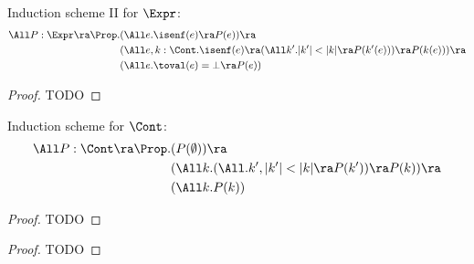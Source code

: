 \begin{lemma}
Induction scheme II for $\Expr$:
\begin{align*}
\All P: \Expr \ra \Prop.
  &(\All e. \isenf(e) \ra P(e)) \ra \\
  &(\All e, k: \Cont . \isenf(e) \ra (\All k'. |k'| < |k| \ra P (k'(e))) \ra P(k(e))) \ra\\
  &(\All e. \toval(e) = \bot \ra P(e))
\end{align*}
\end{lemma}
\begin{proof}
  TODO
\end{proof}

\begin{lemma}
  Induction scheme for $\Cont$:
  \begin{align*}
    \All P: \Cont \ra \Prop.
      &(P(\emptyset)) \ra \\
      &(\All k. (\All. k', |k'| < |k| \ra P(k')) \ra P(k)) \ra \\
      &(\All k. P(k))
  \end{align*}
\end{lemma}
\begin{proof}
  TODO
\end{proof}

\begin{proof}
  TODO
\end{proof}
